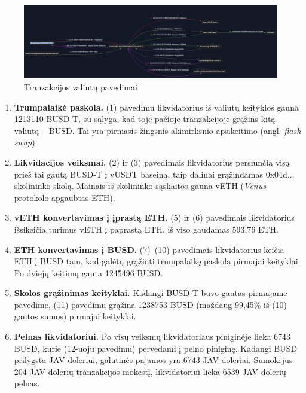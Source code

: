 \documentclass[]{VUMIFTemplateClass}
\begin{document}
\begin{figure}[H]
  \centering
  \includegraphics[scale=0.3]{img/liquidation_example.png}
  \caption{Tranzakcijos valiutų pavedimai \cite{liqpvz}}
  \label{img:liquidation_example}
\end{figure}

\begin{enumerate}
  \item \textbf{Trumpalaikė paskola.}  
  (1) pavedimu likvidatorius iš valiutų keityklos gauna 1213110 BUSD-T, su sąlyga, kad toje pačioje tranzakcijoje grąžins kitą valiutą – BUSD. Tai yra pirmasis žingsnis akimirksnio apsikeitimo (angl. \textit{flash swap}).

  \item \textbf{Likvidacijos veiksmai.}  
  (2) ir (3) pavedimais likvidatorius persiunčią visą prieš tai gautą BUSD-T į vUSDT baseiną, taip dalinai grąžindamas 0x04d... skolininko skolą. Mainais iš skolininko sąskaitos gauna vETH (\textit{Venus} protokolo apgaubtas ETH).

  \item \textbf{vETH konvertavimas į įprastą ETH.}  
  (5) ir (6) pavedimais likvidatorius išsikeičia turimus vETH į paprastą ETH, iš viso gaudamas 593,76 ETH.

  \item \textbf{ETH konvertavimas į BUSD.}  
  (7)--(10) pavedimais likvidatorius keičia ETH į BUSD tam, kad galėtų grąžinti trumpalaikę paskolą pirmajai keityklai. Po dviejų keitimų gauta 1245496 BUSD.

  \item \textbf{Skolos grąžinimas keityklai.}  
  Kadangi BUSD-T buvo gautas pirmajame pavedime, (11) pavedimu 
  grąžina 1238753 BUSD (maždaug 99,45\% iš (10) gautos sumos) pirmajai keityklai.

  \item \textbf{Pelnas likvidatoriui.}  
Po visų veiksmų likvidatoriaus piniginėje lieka 6743 BUSD, kurie (12-uoju pavedimu) pervedami į pelno piniginę.  
Kadangi BUSD prilygsta JAV doleriui, galutinės pajamos yra 6743 JAV doleriai.  
Sumokėjus 204 JAV dolerių tranzakcijos mokestį, likvidatoriui lieka 6539 JAV dolerių pelnas.
\end{enumerate}
\end{document}
